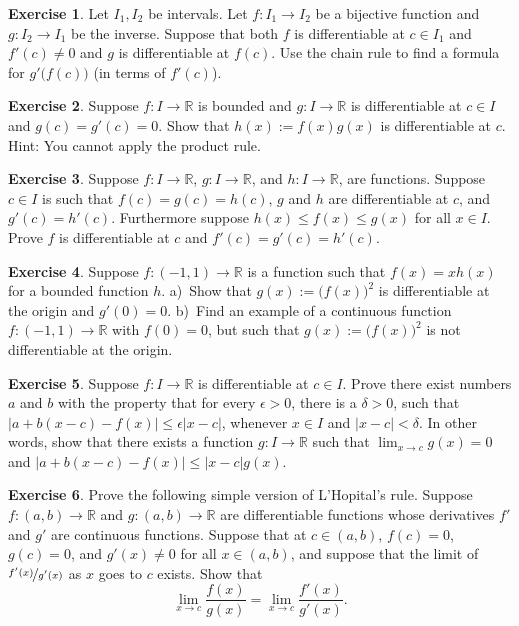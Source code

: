 \documentclass[12pt]{book}
\newcommand{\abs}[1]{\left\lvert {#1} \right\rvert}
\newcommand{\R}{{\mathbb{R}}}
\newcommand{\myindex}[1]{#1\index{#1}}
\theoremstyle{plain}
\theoremstyle{remark}
\theoremstyle{definition}
\theoremstyle{exercise}
\newtheorem{exercise}{Exercise}[section]
\theoremstyle{example}
\begin{document}
\begin{exercise}
Let $I_1, I_2$ be intervals.
Let $f \colon I_1 \to I_2$ be a bijective function and $g \colon I_2 \to I_1$
be the inverse.  Suppose that both $f$ is differentiable at $c \in I_1$ and
$f'(c) \not=0$ and $g$ is differentiable at $f(c)$.  Use the chain rule
to find a formula for $g'\bigl(f(c)\bigr)$ (in terms of $f'(c)$).
\end{exercise}

\begin{exercise} \label{exercise:bndmuldiff}
Suppose $f \colon I \to \R$ is bounded and $g \colon I \to
\R$ is differentiable at $c \in I$ and $g(c) = g'(c) = 0$.  Show
that $h(x) := f(x) g(x)$ is differentiable at $c$.  Hint: You
cannot apply the product rule.
\end{exercise}

\begin{exercise} \label{exercise:diffsqueeze}
Suppose $f \colon I \to \R$, 
$g \colon I \to \R$, and
$h \colon I \to \R$, are functions.  Suppose $c \in I$ is such that
$f(c) = g(c) = h(c)$, $g$ and $h$ are differentiable at $c$,
and $g'(c) = h'(c)$.  Furthermore suppose $h(x) \leq f(x) \leq g(x)$ for
all $x \in I$.  Prove $f$ is differentiable at $c$ and $f'(c) = g'(c) =
h'(c)$.
\end{exercise}

\begin{exercise}
Suppose $f \colon (-1,1) \to \R$ is a function such that $f(x) = x h(x)$ for a bounded
function $h$.  a)~Show that $g(x) := {\bigl( f(x) \bigr)}^2$ is
differentiable at the origin and $g'(0) = 0$.  b)~Find an example of a
continuous function $f \colon (-1,1) \to \R$ with $f(0) = 0$, but such
that $g(x) := {\bigl( f(x) \bigr)}^2$ is not differentiable at the origin.
\end{exercise}

\begin{exercise}
Suppose $f \colon I \to \R$ is differentiable at $c \in I$.
Prove there exist numbers $a$ and $b$ with the property that
for every $\epsilon > 0$, there is a $\delta > 0$, such that
$\abs{a+b(x-c) - f(x)} \leq \epsilon \abs{x-c}$, whenever $x \in I$ and
$\abs{x-c} < \delta$.
In other words, show that
there exists a function $g \colon I \to \R$
such that $\lim_{x\to c} g(x) = 0$ and
$\abs{a+b(x-c) - f(x)} \leq \abs{x-c} g(x)$.
\end{exercise}

\begin{exercise} \label{exercise:simpleLHopital}
Prove the following simple version of \myindex{L'Hopital's rule}.  Suppose 
$f \colon (a,b) \to \R$ and $g \colon (a,b) \to \R$ are differentiable
functions
whose derivatives $f'$ and $g'$ are continuous functions.
Suppose that at $c \in (a,b)$, $f(c) = 0$, $g(c)=0$,
and
$g'(x) \not= 0$ for all $x \in (a,b)$, and suppose
that the limit of $\nicefrac{f'(x)}{g'(x)}$ as $x$ goes to $c$ exists.  Show that
\begin{equation*}
\lim_{x \to c} \frac{f(x)}{g(x)} = 
\lim_{x \to c} \frac{f'(x)}{g'(x)} .
\end{equation*}
\end{exercise}
\end{document}
